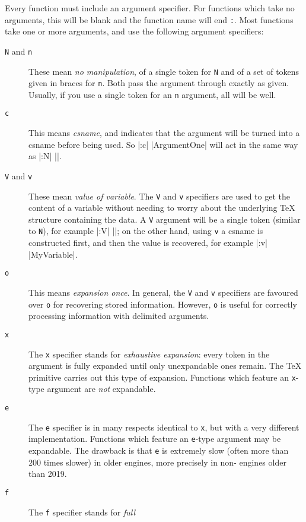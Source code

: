 \documentclass[dvipdfmx,full,kernel]{wtpl3doc}
\begin{document}
Every function must include an argument specifier. For functions which
take no arguments, this will be blank and the function name will end
\texttt{:}. Most functions take one or more arguments, and use the
following argument specifiers:
\begin{description}
  \item[\texttt{N} and \texttt{n}] These mean \emph{no manipulation},
    of a single token for \texttt{N} and of a set of tokens given in
    braces for \texttt{n}. Both pass the argument through exactly as
    given. Usually, if you use a single token for an \texttt{n} argument,
    all will be well.
  \item[\texttt{c}] This means \emph{csname}, and indicates that the
    argument will be turned into a csname before being used. So
    |\foo:c| |{ArgumentOne}| will act in the same way as |\foo:N|
    |\ArgumentOne|.
  \item[\texttt{V} and \texttt{v}] These mean \emph{value
    of variable}. The \texttt{V} and \texttt{v} specifiers are used to
    get the content of a variable without needing to worry about the
    underlying \TeX{} structure containing the data. A \texttt{V}
    argument will be a single token (similar to \texttt{N}), for example
    |\foo:V| |\MyVariable|; on the other hand, using \texttt{v} a
    csname is constructed first, and then the value is recovered, for
    example |\foo:v| |{MyVariable}|.
  \item[\texttt{o}] This means \emph{expansion once}. In general, the
    \texttt{V} and \texttt{v} specifiers are favoured over \texttt{o}
    for recovering stored information. However, \texttt{o} is useful
    for correctly processing information with delimited arguments.
  \item[\texttt{x}] The \texttt{x} specifier stands for \emph{exhaustive
    expansion}: every token in the argument is fully expanded until only
    unexpandable ones remain. The \TeX{}  primitive carries out
    this type of expansion. Functions which feature an \texttt{x}-type
    argument are \emph{not} expandable.
  \item[\texttt{e}] The \texttt{e} specifier is in many respects
    identical to \texttt{x}, but with a very different implementation.
    Functions which feature an \texttt{e}-type argument may be
    expandable.  The drawback is that \texttt{e} is extremely slow
    (often more than $200$ times slower) in older engines, more
    precisely in non-\LuaTeX{} engines older than 2019.
  \item[\texttt{f}] The \texttt{f} specifier stands for \emph{full
}
\end{description}
\end{document}
